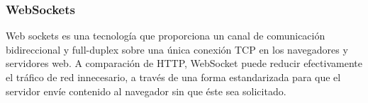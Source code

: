 \subsubsection{WebSockets}
Web sockets es una tecnología que proporciona un canal de comunicación bidireccional y full-duplex sobre una única conexión TCP en los navegadores y servidores web. A comparación de HTTP, WebSocket puede reducir efectivamente el tráfico de red innecesario, a través de una forma estandarizada para que el servidor envíe contenido al navegador sin que éste sea solicitado.\cite{cheng_new_2013}
